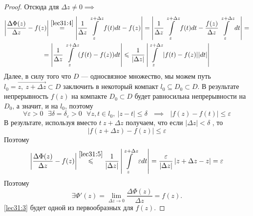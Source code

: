 \documentclass[../../main.tex]{subfiles}
\begin{document}
\begin{proof}
	Отсюда для $ \Delta z \neq 0 \implies $	
	\begin{equation}
	\begin{gathered}
		\label{lec31:5}
		\left| \dfrac{\Delta \Phi(z)}{\Delta z} - f(z) \right|
		\stackrel{ \eqref{lec31:4} }{=} \left|
		\dfrac{1}{\Delta z} \int\limits_{z}^{z + \Delta z} f(t) dt - f(z)
		\right| = \left|
		\dfrac{1}{\Delta z} \int\limits_{z}^{z + \Delta z} f(t) dt - 
		\dfrac{f(z)}{\Delta z} \int\limits_{z}^{z + \Delta z} dt
		\right| = \\
		= \left| \dfrac{1}{\Delta z} \int\limits_{z}^{z + \Delta z}
		(f(t) - f(z) ) dt \right| \le
		\dfrac{1}{ | \Delta z | } \left| \int\limits_{z}^{z + \Delta z}
		| f(t) - f(z) | | dt | \right| 
	\end{gathered}	
	\end{equation}
	Далее, в силу того что $D$ --- односвязное множество, мы можем путь
	$ l_0 = \overrightarrow{z, \ z + \Delta z} \subset D$ заключить в 
	некоторый компакт $ l_0 \subseteq D_0 \subset D$. В результате
	непрерывность $f(z)$ на компакте $D_0 \subset D$ будет равносильна
	непрерывности на $D_0$, а значит, и на $l_0$, поэтому
	\[ \forall \varepsilon > 0 \ \ \ \exists \delta = \delta_\varepsilon
	> 0 \ \ \ \forall z, t \in l_0 , \ |z - t| \leq \delta
	\ \ \ \implies \ \ \ |f(z) - f(t)| \leq \varepsilon \]
	В результате, используя вместо $ t \ z + \Delta z $ получаем, что
	если $| \Delta z| < \delta$ , то
	\[ | f(z + \Delta z ) - f(z) | \leq \varepsilon \]
	Поэтому
	\[ \left| \dfrac{\Delta \Phi(z)}{\Delta z} - f(z) \right|
	\stackrel{ \eqref{lec31:5} }{\le}
	\dfrac{1}{ | \Delta z | } \left| \int\limits_{z}^{z + \Delta z}
	\varepsilon dt \right| = 
	\dfrac{\varepsilon}{ | \Delta z | } \left| z + \Delta
	z - z \right| = \varepsilon\]
	Поэтому
	\[ \exists \Phi ' (z) = \lim\limits_{\Delta z \to 0}
	\dfrac{\Delta \Phi(z)}{\Delta z} = f(z). \]	
	\eqref{lec31:3} будет одной из первообразных для $f(z)$.
\end{proof}
\end{document}
